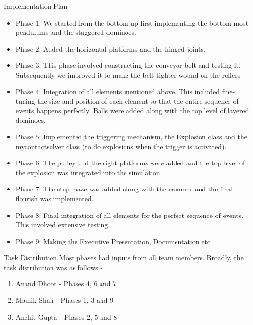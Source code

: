 \documentclass[a4paper,12pt]{article}
\begin{document}
\begin{section}{Implementation Plan}
\begin{itemize}
\item
Phase 1: We started from the bottom up first implementing the bottom-most pendulums and the staggered dominoes.
\item
Phase 2: Added the horizontal platforms and the hinged joints.
\item
Phase 3: This phase involved constructing the conveyor belt and testing it. Subsequently we improved it to make the belt tighter wound on the rollers
\item
Phase 4: Integration of all elements mentioned above. This included fine-tuning the size and position of each element so that the entire sequence of events happens perfectly. Balls were added along with the top level of layered dominoes.
\item
Phase 5: Implemented the triggering mechanism, the Explosion class and the mycontactsolver class (to do explosions when the trigger is activated).
\item
Phase 6: The pulley and the right platforms were added and the top level of the explosion was integrated into the simulation.
\item
Phase 7: The step maze was added along with the cannons and the final flourish was implemented.
\item
Phase 8: Final integration of all elements for the perfect sequence of events. This involved extensive testing.
\item
Phase 9: Making the Executive Presentation, Documentation etc
\end{itemize}
\end{section}
\bigskip

\begin{section}{Task Distribution}
Most phases had inputs from all team members. Broadly, the task distribution was as follows -
\begin{enumerate}
\item Anand Dhoot - Phases 4, 6 and 7
\item Maulik Shah - Phases 1, 3 and 9
\item Anchit Gupta - Phases 2, 5 and 8
\end{enumerate}
\end{section}
\bigskip
\end{document}

